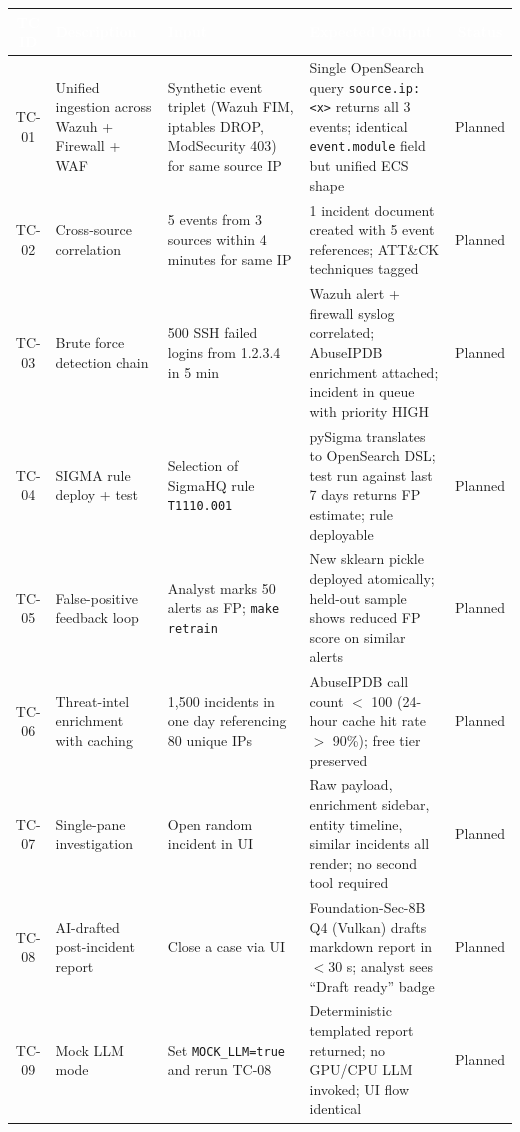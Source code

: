 \documentclass[11pt,a4paper]{article}
\begin{document}
\begin{table}[H]
\small
\setlength{\tabcolsep}{4pt}
\begin{tabularx}{\textwidth}{|>{}c|L{2.6cm}|L{3.4cm}|L{5.2cm}|c|}
\hline
{}\textcolor{white}{\textbf{TC ID}} & \textcolor{white}{\textbf{Description}} & \textcolor{white}{\textbf{Input}} & \textcolor{white}{\textbf{Expected Output}} & \textcolor{white}{\textbf{Status}} \\
\hline
TC-01 & Unified ingestion across Wazuh + Firewall + WAF & Synthetic event triplet (Wazuh FIM, iptables DROP, ModSecurity 403) for same source IP & Single OpenSearch query \texttt{source.ip:<x>} returns all 3 events; identical \texttt{event.module} field but unified ECS shape & Planned \\
\hline
TC-02 & Cross-source correlation & 5 events from 3 sources within 4 minutes for same IP & 1 incident document created with 5 event references; ATT\&CK techniques tagged & Planned \\
\hline
TC-03 & Brute force detection chain & 500 SSH failed logins from 1.2.3.4 in 5 min & Wazuh alert + firewall syslog correlated; AbuseIPDB enrichment attached; incident in queue with priority HIGH & Planned \\
\hline
TC-04 & SIGMA rule deploy + test & Selection of SigmaHQ rule \texttt{T1110.001} & pySigma translates to OpenSearch DSL; test run against last 7 days returns FP estimate; rule deployable & Planned \\
\hline
TC-05 & False-positive feedback loop & Analyst marks 50 alerts as FP; \texttt{make retrain} & New sklearn pickle deployed atomically; held-out sample shows reduced FP score on similar alerts & Planned \\
\hline
TC-06 & Threat-intel enrichment with caching & 1,500 incidents in one day referencing 80 unique IPs & AbuseIPDB call count $<$ 100 (24-hour cache hit rate $>$ 90\%); free tier preserved & Planned \\
\hline
TC-07 & Single-pane investigation & Open random incident in UI & Raw payload, enrichment sidebar, entity timeline, similar incidents all render; no second tool required & Planned \\
\hline
TC-08 & AI-drafted post-incident report & Close a case via UI & Foundation-Sec-8B Q4 (Vulkan) drafts markdown report in $<$30 s; analyst sees ``Draft ready'' badge & Planned \\
\hline
TC-09 & Mock LLM mode & Set \texttt{MOCK\_LLM=true} and rerun TC-08 & Deterministic templated report returned; no GPU/CPU LLM invoked; UI flow identical & Planned \\

\end{tabularx}
\end{table}
\end{document}
